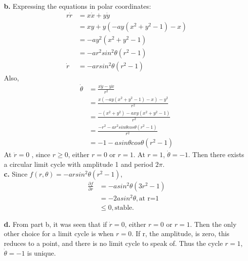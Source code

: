 \documentclass[12pt]{article}
\begin{document}
	{\bf b. }Expressing the equations in polar coordinates:\\
	\begin{align*}
	r\dot{r} &= x\dot{x} + y\dot{y}\\
	&=xy + y(-ay(x^2 + y^2 -1) - x)\\
	&=-ay^2(x^2 + y^2 -1)\\
	&=-ar^2sin^2\theta (r^2 - 1)\\
	\dot{r} &= -arsin^2\theta(r^2 - 1)
	\end{align*}
	Also,
	\begin{align*}
	\dot{\theta} &= \frac{x\dot{y} - y\dot{x}}{r^2}\\
	&= \frac{x(-ay(x^2 + y^2 -1) -x) - y^2}{r^2}\\
	&= \frac{-(x^2+y^2) -axy(x^2 + y^2 -1)}{r^2}\\
	&= \frac{-r^2 -ar^2sin\theta cos\theta (r^2-1)}{r^2}\\
	&= -1 -asin\theta cos\theta (r^2 - 1)
	\end{align*}
	At $\dot{r}=0$ , since $r \geq 0$, either $r=0$ or $r=1$. At $r=1$, $\dot{\theta} = -1$.
	Then there exists a circular limit cycle with amplitude 1 and period $2\pi$.\\
	
	{\bf c. }Since $f(r,\theta) = -arsin^2\theta(r^2 -1 )$,\\
	\begin{align*}
	\frac{\partial f}{\partial r} &= -asin^2\theta(3r^2-1)\\
	&=-2asin^2\theta, \text{at r=1}\\
	&\leq 0, \text{stable.}
	\end{align*}
	
	{\bf d. }From part b, it was seen that if $\dot{r}=0$, either $r=0$ or $r=1$. Then the only other choice for a limit cycle is when $r=0$. If r, the amplitude, is zero, this reduces to a point, and there is no limit cycle to speak of. Thus the cycle $r=1$, $\dot{\theta} = -1$ is unique.\\
	
\end{document}

